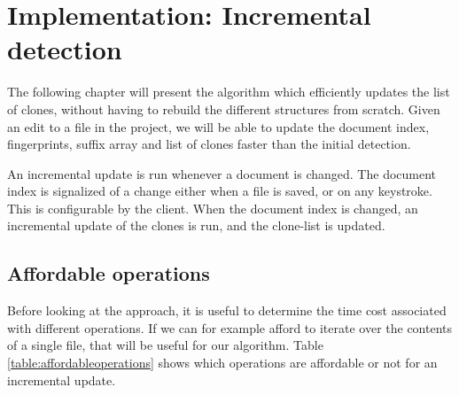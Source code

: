 \chapter{Implementation: Incremental detection}

The following chapter will present the algorithm which efficiently updates the list of
clones, without having to rebuild the different structures from scratch. Given an edit
to a file in the project, we will be able to update the document index, fingerprints,
suffix array and list of clones faster than the initial detection.

An incremental update is run whenever a document is changed. The document index is
signalized of a change either when a file is saved, or on any keystroke. This is
configurable by the client. When the document index is changed, an incremental update of
the clones is run, and the clone-list is updated.

\section{Affordable operations}

Before looking at the approach, it is useful to determine the time cost associated with
different operations. If we can for example afford to iterate over the contents of a
single file, that will be useful for our algorithm. Table \ref{table:affordableoperations}
shows which operations are affordable or not for an incremental update.

